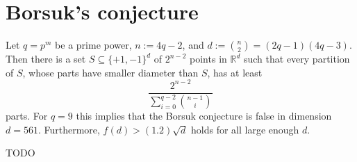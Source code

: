 \chapter{Borsuk's conjecture}

\begin{theorem}
  \label{borsuk_conjecture}
  Let $q = p^m$ be a prime power, $n := 4q - 2$, and $d := \binom{n}{2} = (2q - 1)(4q - 3)$.
  Then there is a set $S \subseteq \{+1, -1\}^d$ of $2^{n-2}$ points in $\mathbb{R}^d$
  such that every partition of $S$, whose parts have smaller diameter than $S$, has at least
  \[
  \frac{2^{n-2}}{\sum_{i=0}^{q-2} \binom{n-1}{i}}
  \]
  parts. For $q = 9$ this implies that the Borsuk conjecture is false in dimension $d = 561$.
  Furthermore, $f(d) > (1.2)\sqrt{d}$ holds for all large enough $d$.
\end{theorem}
\begin{theorem}
  TODO
\end{theorem}
